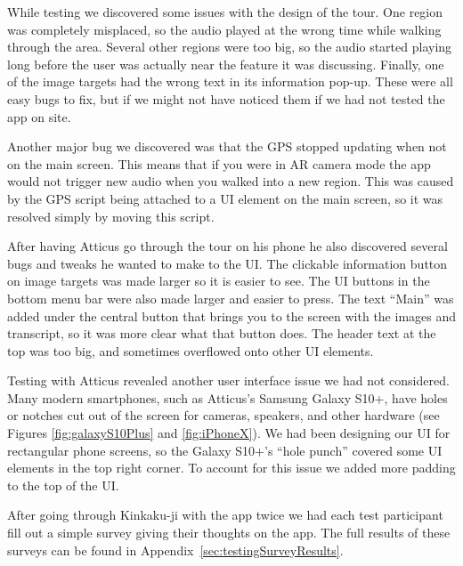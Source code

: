 \documentclass[a4paper, 10pt, american, titlepage]{article}
\begin{document}
While testing we discovered some issues with the design of the tour. One region
was completely misplaced, so the audio played at the wrong time while walking
through the area. Several other regions were too big, so the audio started
playing long before the user was actually near the feature it was discussing.
Finally, one of the image targets had the wrong text in its information pop-up.
These were all easy bugs to fix, but if we might not have noticed them if we
had not tested the app on site.

Another major bug we discovered was that the GPS stopped updating when not on
the main screen. This means that if you were in AR camera mode the app would not
trigger new audio when you walked into a new region. This was caused by the GPS
script being attached to a UI element on the main screen, so it was resolved
simply by moving this script.

After having Atticus go through the tour on his phone he also discovered several
bugs and tweaks he wanted to make to the UI. The clickable information button on
image targets was made larger so it is easier to see. The UI buttons in the
bottom menu bar were also made larger and easier to press. The text ``Main'' was
added under the central button that brings you to the screen with the images and
transcript, so it was more clear what that button does. The header text at the
top was too big, and sometimes overflowed onto other UI elements.

Testing with Atticus revealed another user interface issue we had not
considered.  Many modern smartphones, such as Atticus's Samsung Galaxy S10+,
have holes or notches cut out of the screen for cameras, speakers, and other
hardware (see Figures \ref{fig:galaxyS10Plus} and \ref{fig:iPhoneX}). We had
been designing our UI for rectangular phone screens, so the Galaxy S10+'s ``hole
punch'' covered some UI elements in the top right corner. To account for this
issue we added more padding to the top of the UI.

After going through Kinkaku-ji with the app twice we had each test participant
fill out a simple survey giving their thoughts on the app. The full results of
these surveys can be found in Appendix~\ref{sec:testingSurveyResults}.
\end{document}
